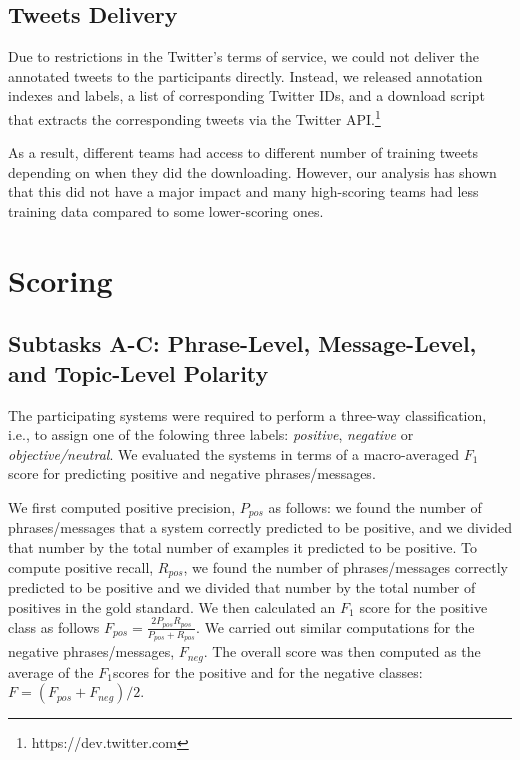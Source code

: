 \documentclass[11pt]{article}
\begin{document}
\subsection{Tweets Delivery}

Due to restrictions in the Twitter's terms of service, we could not deliver the annotated tweets to the participants directly.
Instead, we released annotation indexes and labels, a list of corresponding Twitter IDs, and a download script that extracts the corresponding tweets via the Twitter API.\footnote{https://dev.twitter.com}

As a result, different teams had access to different number of training tweets depending on when they did the downloading.
However, our analysis has shown that this did not have a major impact and many high-scoring teams had less training data compared to some lower-scoring ones.


\section{Scoring}
\label{Section:scoring}

\subsection{Subtasks A-C: Phrase-Level, Message-Level, and Topic-Level Polarity}

The participating systems were required to perform a three-way classification,
i.e., to assign one of the folowing three labels:
{\em positive}, {\em negative} or {\em objective/neutral}.
We evaluated the systems in terms of a macro-averaged $F_1$ score for predicting positive and negative phrases/messages.

We first computed positive precision, $P_{pos}$ as follows:
we found the number of phrases/messages that a system correctly predicted to be positive,
and we divided that number by the total number of examples it predicted to be positive.
To compute positive recall, $R_{pos}$, we found the number of phrases/messages correctly predicted to be positive and we divided that number by the total number of positives in the gold standard.
We then calculated an $F_1$ score for the positive class
as follows $F_{pos}=\frac{2 P_{pos} R_{pos}}{P_{pos} + R_{pos}}$. 
We carried out similar computations for the negative phrases/messages, $F_{neg}$.
The overall score
was then computed as the average of the $F_1$scores for the positive and for the negative classes:
$F=(F_{pos}+F_{neg})/2$.
\end{document}

